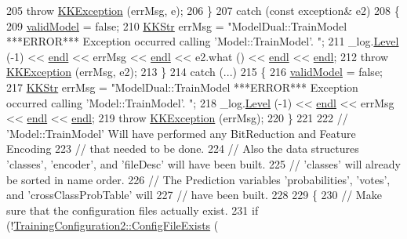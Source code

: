 \begin{DoxyCode}
205     \textcolor{keywordflow}{throw}  \hyperlink{class_k_k_b_1_1_k_k_exception}{KKException} (errMsg, e);
206   \}
207   \textcolor{keywordflow}{catch} (\textcolor{keyword}{const} exception& e2)
208   \{
209     \hyperlink{class_k_k_m_l_l_1_1_model_af881a051b703412686fa3b4a62b6d68a}{validModel} = \textcolor{keyword}{false};
210     \hyperlink{class_k_k_b_1_1_k_k_str}{KKStr} errMsg = \textcolor{stringliteral}{"ModelDual::TrainModel  ***ERROR*** Exception occurred calling 'Model::TrainModel'.
      "};
211     \_log.\hyperlink{class_k_k_b_1_1_run_log_a32cf761d7f2e747465fd80533fdbb659}{Level} (-1) << \hyperlink{namespace_k_k_b_ad1f50f65af6adc8fa9e6f62d007818a8}{endl} << errMsg << \hyperlink{namespace_k_k_b_ad1f50f65af6adc8fa9e6f62d007818a8}{endl} << e2.what () << \hyperlink{namespace_k_k_b_ad1f50f65af6adc8fa9e6f62d007818a8}{endl} << 
      \hyperlink{namespace_k_k_b_ad1f50f65af6adc8fa9e6f62d007818a8}{endl};
212     \textcolor{keywordflow}{throw} \hyperlink{class_k_k_b_1_1_k_k_exception}{KKException} (errMsg, e2);
213   \}
214   \textcolor{keywordflow}{catch} (...)
215   \{
216     \hyperlink{class_k_k_m_l_l_1_1_model_af881a051b703412686fa3b4a62b6d68a}{validModel} = \textcolor{keyword}{false};
217     \hyperlink{class_k_k_b_1_1_k_k_str}{KKStr} errMsg = \textcolor{stringliteral}{"ModelDual::TrainModel  ***ERROR*** Exception occurred calling 'Model::TrainModel'.
      "};
218     \_log.\hyperlink{class_k_k_b_1_1_run_log_a32cf761d7f2e747465fd80533fdbb659}{Level} (-1) << \hyperlink{namespace_k_k_b_ad1f50f65af6adc8fa9e6f62d007818a8}{endl} << errMsg << \hyperlink{namespace_k_k_b_ad1f50f65af6adc8fa9e6f62d007818a8}{endl} << \hyperlink{namespace_k_k_b_ad1f50f65af6adc8fa9e6f62d007818a8}{endl};
219     \textcolor{keywordflow}{throw} \hyperlink{class_k_k_b_1_1_k_k_exception}{KKException} (errMsg);
220   \}
221     
222   \textcolor{comment}{// 'Model::TrainModel'  Will have performed any BitReduction and Feature Encoding }
223   \textcolor{comment}{// that needed to be done.  }
224   \textcolor{comment}{// Also the data structures 'classes', 'encoder', and 'fileDesc' will have been built.}
225   \textcolor{comment}{// 'classes' will already be sorted in name order.}
226   \textcolor{comment}{// The Prediction variables 'probabilities', 'votes', and 'crossClassProbTable' will}
227   \textcolor{comment}{// have been built.}
228 
229   \{
230     \textcolor{comment}{// Make sure that the configuration files actually exist.}
231     \textcolor{keywordflow}{if}  (!\hyperlink{class_k_k_m_l_l_1_1_training_configuration2_a3e117aa7769b114dae46467fcf25fba5}{TrainingConfiguration2::ConfigFileExists} (

\end{DoxyCode}
